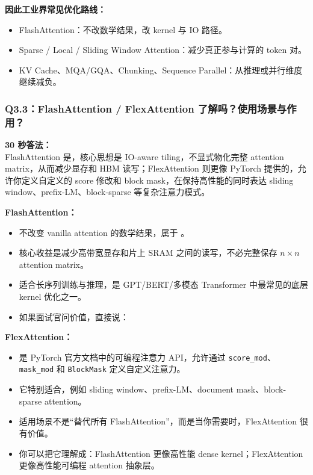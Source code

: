 \textbf{因此工业界常见优化路线：}
\begin{itemize}[leftmargin=1.5em]
  \item FlashAttention：不改数学结果，改 kernel 与 IO 路径。
  \item Sparse / Local / Sliding Window Attention：减少真正参与计算的 token 对。
  \item KV Cache、MQA/GQA、Chunking、Sequence Parallel：从推理或并行维度继续减负。
\end{itemize}

\subsubsection{Q3.3：FlashAttention / FlexAttention 了解吗？使用场景与作用？}

\begin{conceptbox}
\textbf{30 秒答法：}\\
FlashAttention 是，核心思想是 IO-aware tiling，不显式物化完整 attention matrix，从而减少显存和 HBM 读写；FlexAttention 则更像 PyTorch 提供的，允许你定义自定义的 score 修改和 block mask，在保持高性能的同时表达 sliding window、prefix-LM、block-sparse 等复杂注意力模式。
\end{conceptbox}

\textbf{FlashAttention：}
\begin{itemize}[leftmargin=1.5em]
  \item 不改变 vanilla attention 的数学结果，属于 。
  \item 核心收益是减少高带宽显存和片上 SRAM 之间的读写，不必完整保存 $n \times n$ attention matrix。
  \item 适合长序列训练与推理，是 GPT/BERT/多模态 Transformer 中最常见的底层 kernel 优化之一。
  \item 如果面试官问价值，直接说：
\end{itemize}

\textbf{FlexAttention：}
\begin{itemize}[leftmargin=1.5em]
  \item 是 PyTorch 官方文档中的可编程注意力 API，允许通过 \texttt{score\_mod}、\texttt{mask\_mod} 和 \texttt{BlockMask} 定义自定义注意力。
  \item 它特别适合，例如 sliding window、prefix-LM、document mask、block-sparse attention。
  \item 适用场景不是“替代所有 FlashAttention”，而是当你需要时，FlexAttention 很有价值。
  \item 你可以把它理解成：FlashAttention 更像高性能 dense kernel；FlexAttention 更像高性能可编程 attention 抽象层。
\end{itemize}

